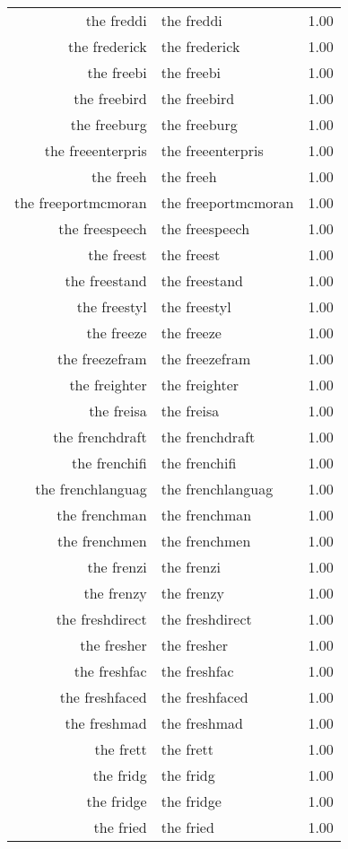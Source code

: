 \begin{table}[ht]
\begin{tabular}{rlr}
  the freddi & the freddi & 1.00 \\ 
  the frederick & the frederick & 1.00 \\ 
  the freebi & the freebi & 1.00 \\ 
  the freebird & the freebird & 1.00 \\ 
  the freeburg & the freeburg & 1.00 \\ 
  the freeenterpris & the freeenterpris & 1.00 \\ 
  the freeh & the freeh & 1.00 \\ 
  the freeportmcmoran & the freeportmcmoran & 1.00 \\ 
  the freespeech & the freespeech & 1.00 \\ 
  the freest & the freest & 1.00 \\ 
  the freestand & the freestand & 1.00 \\ 
  the freestyl & the freestyl & 1.00 \\ 
  the freeze & the freeze & 1.00 \\ 
  the freezefram & the freezefram & 1.00 \\ 
  the freighter & the freighter & 1.00 \\ 
  the freisa & the freisa & 1.00 \\ 
  the frenchdraft & the frenchdraft & 1.00 \\ 
  the frenchifi & the frenchifi & 1.00 \\ 
  the frenchlanguag & the frenchlanguag & 1.00 \\ 
  the frenchman & the frenchman & 1.00 \\ 
  the frenchmen & the frenchmen & 1.00 \\ 
  the frenzi & the frenzi & 1.00 \\ 
  the frenzy & the frenzy & 1.00 \\ 
  the freshdirect & the freshdirect & 1.00 \\ 
  the fresher & the fresher & 1.00 \\ 
  the freshfac & the freshfac & 1.00 \\ 
  the freshfaced & the freshfaced & 1.00 \\ 
  the freshmad & the freshmad & 1.00 \\ 
  the frett & the frett & 1.00 \\ 
  the fridg & the fridg & 1.00 \\ 
  the fridge & the fridge & 1.00 \\ 
  the fried & the fried & 1.00 \\ 

\end{tabular}
\end{table}
